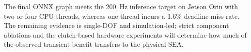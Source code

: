 \documentclass[letterpaper,journal]{IEEEtran}
\begin{document}
The final ONNX graph meets the 200~Hz inference target on Jetson Orin with two or four CPU threads, whereas one thread incurs a 1.6\% deadline-miss rate. The remaining evidence is single-DOF and simulation-led; strict component ablations and the clutch-based hardware experiments will determine how much of the observed transient benefit transfers to the physical SEA.


 
 

%
\end{document}
